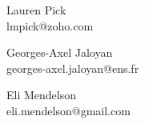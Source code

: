 \documentclass[12pt]{article}
\theoremstyle{example}
\begin{document}
\begin{minipage}{0.3\textwidth}
\large
\begin{center}
Lauren Pick\\
\small{
lmpick@zoho.com\\
}
\end{center}
\end{minipage}
\begin{minipage}{0.3\textwidth}
\large
\begin{center}
Georges-Axel Jaloyan \\
\small{
georges-axel.jaloyan@ens.fr\\
}
\end{center}
\end{minipage}
\begin{minipage}{0.3\textwidth}
\large
\begin{center}
Eli Mendelson \\
\small{
eli.mendelson@gmail.com\\
}
\end{center}
\end{minipage}

\vspace{1cm}


\pagebreak

\pagebreak

\pagebreak

\pagebreak

\pagebreak

\pagebreak

\pagebreak

\pagebreak

\pagebreak

\pagebreak

\end{document}
